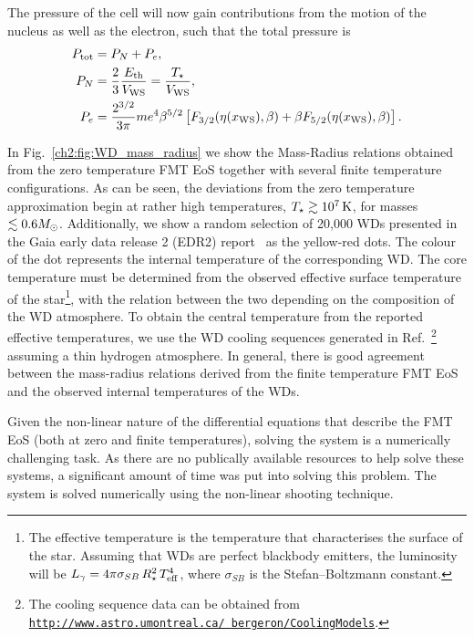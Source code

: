 The pressure of the cell will now gain contributions from the motion of the nucleus as well as the electron, such that the total pressure is
\begin{align}
    P_\mathrm{tot} & = P_N + P_e,\\
    P_N & = \frac{2}{3}\frac{E_\mathrm{th}}{V_\mathrm{WS}} = \frac{T_\star}{V_\mathrm{WS}},\\
    P_e & = \frac{2^{3/2}}{3\pi} me^4 \beta^{5/2}\left[  F_{3/2}(\eta(x_\mathrm{WS}), \beta) + \beta F_{5/2}(\eta(x_\mathrm{WS}), \beta)  \right].
\end{align}

In Fig.~\ref{ch2:fig:WD_mass_radius} we show the Mass-Radius relations obtained from the zero temperature FMT EoS together with several finite temperature configurations. As can be seen, the deviations from the zero temperature approximation begin at rather high temperatures, $T_\star\gtrsim 10^7{\rm \,K}$, for masses $\lesssim 0.6 M_\odot$. Additionally, we show a random selection of 20,000 WDs presented in the Gaia early data release 2 (EDR2) report~\cite{GentileFusillo_feb_GaiaDataRelease} as the yellow-red dots. The colour of the dot represents the internal temperature of the corresponding WD. The core temperature must be determined from the observed effective surface temperature of the star\footnote{The effective temperature is the temperature that characterises the surface of the star. Assuming that WDs are perfect blackbody emitters, the luminosity will be $L_\gamma = 4\pi \sigma_{SB} \, R_\star^2 \, T_{\rm eff}^4$, where $\sigma_{SB}$ is the Stefan–Boltzmann constant.}, with the relation between the two depending on the composition of the WD atmosphere. To obtain the central temperature from the reported effective temperatures, we use the WD cooling sequences generated in Ref.~\cite{Bedard_oct_Spectralevolutionhot}\footnote{The cooling sequence data can be obtained from\\\href{http://www.astro.umontreal.ca/~bergeron/CoolingModels}{\texttt{http://www.astro.umontreal.ca/~bergeron/CoolingModels}}.} assuming a thin hydrogen atmosphere. In general, there is good agreement between the mass-radius relations derived from the finite temperature FMT EoS and the observed internal temperatures of the WDs.

Given the non-linear nature of the differential equations that describe the FMT EoS (both at zero and finite temperatures), solving the system is a numerically challenging task. As there are no publically available resources to help solve these systems, a significant amount of time was put into solving this problem. The system is solved numerically using the non-linear shooting technique.

